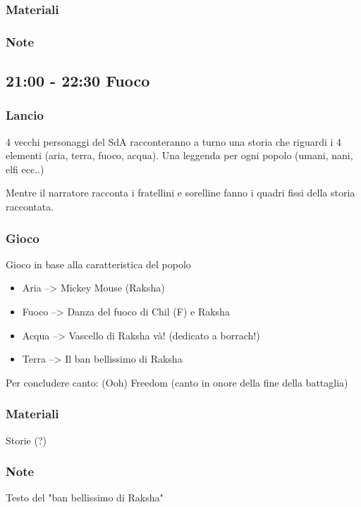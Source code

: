 \documentclass[../main.tex]{subfiles}
\begin{document}
        \subsubsection{Materiali}
        \subsubsection{Note}
        
    \subsection{21:00 - 22:30 Fuoco}
        \subsubsection{Lancio}
        4 vecchi personaggi del SdA racconteranno a turno una storia che riguardi i 4 elementi (aria, terra, fuoco, acqua).    
        Una leggenda per ogni popolo (umani, nani, elfi ecc..)

        Mentre il narratore racconta i fratellini e sorelline fanno i quadri fissi della storia raccontata.

        \subsubsection{Gioco}
        Gioco in base alla caratteristica del popolo
        \begin{itemize}
            \item Aria --> Mickey Mouse (Raksha)
            \item Fuoco --> Danza del fuoco di Chil (F) e Raksha 
            \item Acqua --> Vascello di Raksha và! 	(dedicato a borrach!)
            \item Terra --> Il ban bellissimo di Raksha
        \end{itemize}
        Per concludere canto: (Ooh) Freedom (canto in onore della fine della battaglia)
        
        \subsubsection{Materiali}
        Storie (?)
        \subsubsection{Note}
        Testo del "ban bellissimo di Raksha"\\
        
\end{document}

